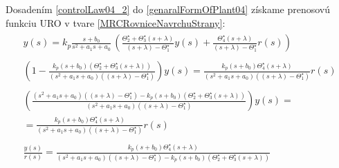 \documentclass[a4paper, 10pt, ]{article}
\begin{document}
Dosadením \eqref{controlLaw04_2} do \eqref{genaralFormOfPlant04} získame prenosovú funkciu URO v tvare \eqref{MRCRovniceNavrchuStrany}:
\begin{subequations} \label{MRCRovniceNavrchuStrany}
	\begin{align}
		\begin{split}
		\label{genaralFormOfCL}
			y(s)
			=
			k_p
			\frac{
				s + b_0
				}{
				s^2 + a_1 s + a_0}
			\,
			\left(
				\frac{
					\Theta_2^\star
					+
					\Theta_3^\star
					(s + \lambda)
					}{
					(s + \lambda)
					-
					\Theta_1^\star}
				y(s)
				+
				\frac{
					\Theta_4^\star
					(s + \lambda)
					}{
					(s + \lambda)
					-
					\Theta_1^\star}
				r(s)
			\right)
		\end{split}
		\\
		\begin{split}
		\left(
			1
			-
			\frac{
				k_p
				(s + b_0)
				\left(
					\Theta_2^\star
					+
					\Theta_3^\star
					(s + \lambda)
				\right)
				}{
				(s^2 + a_1 s + a_0)
				\left(
					(s + \lambda)
					-
					\Theta_1^\star
				\right)}
		\right)
			y(s)
			=
			\frac{
				k_p
				(s + b_0)
				\Theta_4^\star
				(s + \lambda)
				}{
				(s^2 + a_1 s + a_0)
				\left(
					(s + \lambda)
					-
					\Theta_1^\star
				\right)}
			r(s)
		\end{split}
		\\
		\begin{split}
		\left(
			\frac{
				(s^2 + a_1 s + a_0)
				\left(
					(s + \lambda)
					-
					\Theta_1^\star
				\right)
				-
				k_p
				(s + b_0)
				\left(
					\Theta_2^\star
					+
					\Theta_3^\star
					(s + \lambda)
				\right)
				}{
				(s^2 + a_1 s + a_0)
				\left(
					(s + \lambda)
					-
					\Theta_1^\star
				\right)}
		\right)
			y(s)
			=\\=
			\frac{
				k_p
				(s + b_0)
				\Theta_4^\star
				(s + \lambda)
				}{
				(s^2 + a_1 s + a_0)
				\left(
					(s + \lambda)
					-
					\Theta_1^\star
				\right)}
				r(s)
		\end{split}
		\\
		\label{genaralFormOfCL_04}
		\begin{split}
			\frac{y(s)}{r(s)}
			=
			\frac{
				k_p
				(s + b_0)
				\Theta_4^\star
				(s + \lambda)
				}{
				(s^2 + a_1 s + a_0)
				\left(
					(s + \lambda)
					-
					\Theta_1^\star
				\right)
				-
				k_p
				(s + b_0)
				\left(
					\Theta_2^\star
					+
					\Theta_3^\star
					(s + \lambda)
				\right)}
		\end{split}
	\end{align}
\end{subequations}
\end{document}
